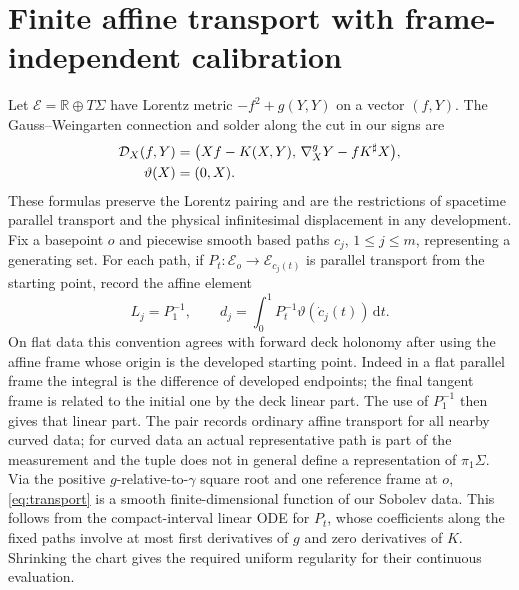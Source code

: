 \documentclass[11pt]{article}
\theoremstyle{remark}
\newcommand{\dd}{\mathrm{d}}
\begin{document}
\section{Finite affine transport with frame-independent calibration}\label{sec:cartan}

Let \(\mathcal E=\mathbb R\oplus T\Sigma\) have Lorentz metric \(-f^2+g(Y,Y)\) on a vector \((f,Y)\). The Gauss--Weingarten connection and solder along the cut in our signs are
\begin{align}
 {\cal D}_X(f,Y)&=\bigl(Xf-K(X,Y),\,\nabla^g_XY-fK^\sharp X\bigr),\notag\\
 \vartheta(X)&=(0,X).
 \label{eq:GW}
\end{align}
These formulas preserve the Lorentz pairing and are the restrictions of spacetime parallel transport and the physical infinitesimal displacement in any development. Fix a basepoint \(o\) and piecewise smooth based paths \(c_j\), \(1\leq j\leq m\), representing a generating set. For each path, if \(P_t:\mathcal E_o\to\mathcal E_{c_j(t)}\) is parallel transport from the starting point, record the affine element
\begin{equation}
 L_j=P_1^{-1},\qquad
 d_j=\int_0^1 P_t^{-1}\vartheta(\dot c_j(t))\,\dd t .
 \label{eq:transport}
\end{equation}
On flat data this convention agrees with forward deck holonomy after using the affine frame whose origin is the developed starting point. Indeed in a flat parallel frame the integral is the difference of developed endpoints; the final tangent frame is related to the initial one by the deck linear part. The use of \(P_1^{-1}\) then gives that linear part. The pair records ordinary affine transport for all nearby curved data; for curved data an actual representative path is part of the measurement and the tuple does not in general define a representation of \(\pi_1\Sigma\). Via the positive \(g\)-relative-to-\(\gamma\) square root and one reference frame at \(o\), \eqref{eq:transport} is a smooth finite-dimensional function of our Sobolev data. This follows from the compact-interval linear ODE for \(P_t\), whose coefficients along the fixed paths involve at most first derivatives of \(g\) and zero derivatives of \(K\). Shrinking the chart gives the required uniform regularity for their continuous evaluation.
\end{document}
